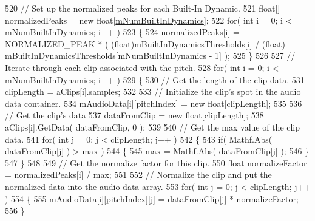 \begin{DoxyCodeInclude}
{520             \textcolor{comment}{// Set up the normalized peaks for each Built-In Dynamic.}
521             \textcolor{keywordtype}{float}[] normalizedPeaks = \textcolor{keyword}{new} \textcolor{keywordtype}{float}[\hyperlink{group___v_i_base_pro_var_gac265f64f759d267ee1e1680f8d387011}{mNumBuiltInDynamics}];
522             \textcolor{keywordflow}{for}( \textcolor{keywordtype}{int} i = 0; i < \hyperlink{group___v_i_base_pro_var_gac265f64f759d267ee1e1680f8d387011}{mNumBuiltInDynamics}; i++ )
523             \{
524                 normalizedPeaks[i] = NORMALIZED\_PEAK * ( (float)mBuiltInDynamicsThresholds[i] / (\textcolor{keywordtype}{float})
      mBuiltInDynamicsThresholds[mNumBuiltInDynamics - 1] );
525             \}
526 
527             \textcolor{comment}{// Iterate through each clip associated with the pitch.}
528             \textcolor{keywordflow}{for}( \textcolor{keywordtype}{int} i = 0; i < \hyperlink{group___v_i_base_pro_var_gac265f64f759d267ee1e1680f8d387011}{mNumBuiltInDynamics}; i++ )
529             \{
530                 \textcolor{comment}{// Get the length of the clip data. }
531                 clipLength = aClips[i].samples;
532 
533                 \textcolor{comment}{// Initialize the clip's spot in the audio data container.}
534                 mAudioData[i][pitchIndex] = \textcolor{keyword}{new} \textcolor{keywordtype}{float}[clipLength];
535 
536                 \textcolor{comment}{// Get the clip's data}
537                 dataFromClip = \textcolor{keyword}{new} \textcolor{keywordtype}{float}[clipLength];
538                 aClips[i].GetData( dataFromClip, 0 );
539 
540                 \textcolor{comment}{// Get the max value of the clip data.}
541                 \textcolor{keywordflow}{for}( \textcolor{keywordtype}{int} j = 0; j < clipLength; j++ )
542                 \{
543                     \textcolor{keywordflow}{if}( Mathf.Abs( dataFromClip[j] ) > max )
544                     \{
545                         max = Mathf.Abs( dataFromClip[j] );
546                     \}
547                 \}
548 
549                 \textcolor{comment}{// Get the normalize factor for this clip.}
550                 \textcolor{keywordtype}{float} normalizeFactor = normalizedPeaks[i] / max;
551 
552                 \textcolor{comment}{// Normalize the clip and put the normalized data into the audio data array.}
553                 \textcolor{keywordflow}{for}( \textcolor{keywordtype}{int} j = 0; j < clipLength; j++ )
554                 \{
555                     mAudioData[i][pitchIndex][j] = dataFromClip[j] * normalizeFactor;
556                 \}
}
\end{DoxyCodeInclude}
